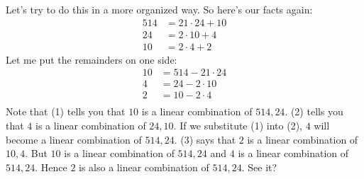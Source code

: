 Let's try to do this in a more organized way.
So here's our facts again:
\begin{align*}
514 &= 21 \cdot 24 + 10 \\
24  &= 2 \cdot 10 + 4 \\
10  &= 2 \cdot 4 + 2 
\end{align*}
Let me put the remainders on one side:
\begin{align*}
10 &= 514 - 21 \cdot 24 \tag{1} \\
4  &= 24  - 2 \cdot 10  \tag{2} \\
2  &= 10  - 2 \cdot 4   \tag{3} \\
\end{align*}
Note that (1) tells you that
$10$ is a linear combination of $514,24$.
(2) tells you that $4$ is a linear combination of $24,10$.
If we substitute (1) into (2), $4$ will become a linear
combination of $514,24$.
(3) says that $2$ is a linear combination of $10,4$.
But $10$ is a linear combination of $514,24$
and $4$ is a linear combination of $514,24$.
Hence $2$ is also a linear combination of $514,24$.
See it?

